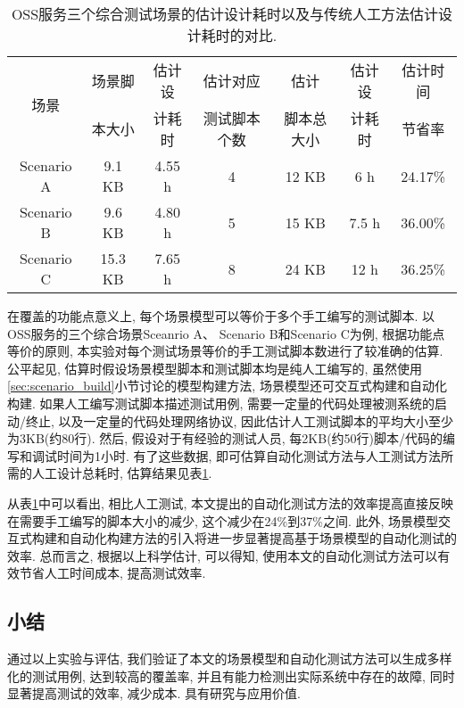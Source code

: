             \begin{table}[!htb]
                \centering
                \small
                \begin{tabular}{ccc|ccc|c}
                    \toprule
                    \multirow{2}{*}{场景} & 场景脚 & 估计设 & 估计对应     & 估计   & 估计设     & 估计时间  \\
                                          & 本大小     & 计耗时                        & 测试脚本个数 & 脚本总大小 & 计耗时 & 节省率 \\
                    \midrule
                    Scenario A & 9.1 KB & 4.55 h & 4 & 12 KB & 6 h & 24.17\% \\
                    Scenario B & 9.6 KB & 4.80 h & 5 & 15 KB & 7.5 h & 36.00\% \\
                    Scenario C & 15.3 KB & 7.65 h & 8 & 24 KB & 12 h & 36.25\% \\
                    \bottomrule
                \end{tabular}
                \caption[OSS服务中场景设计估计耗时与人工脚本设计估计耗时对比表]{OSS服务三个综合测试场景的估计设计耗时以及与传统人工方法估计设计耗时的对比.}
                \label{tab:efficiency_esti}
            \end{table}
            
            在覆盖的功能点意义上, 每个场景模型可以等价于多个手工编写的测试脚本. 以OSS服务的三个综合场景Sceanrio A、 Scenario B和Scenario C为例, 根据功能点等价的原则, 本实验对每个测试场景等价的手工测试脚本数进行了较准确的估算. 公平起见, 估算时假设场景模型脚本和测试脚本均是纯人工编写的, 虽然使用\ref{sec:scenario_build}小节讨论的模型构建方法, 场景模型还可交互式构建和自动化构建. 如果人工编写测试脚本描述测试用例, 需要一定量的代码处理被测系统的启动/终止, 以及一定量的代码处理网络协议, 因此估计人工测试脚本的平均大小至少为3KB(约80行). 然后, 假设对于有经验的测试人员, 每2KB(约50行)脚本/代码的编写和调试时间为1小时. 有了这些数据, 即可估算自动化测试方法与人工测试方法所需的人工设计总耗时, 估算结果见表\ref{tab:efficiency_esti}.
            
            从表\ref{tab:efficiency_esti}中可以看出, 相比人工测试, 本文提出的自动化测试方法的效率提高直接反映在需要手工编写的脚本大小的减少, 这个减少在24\%到37\%之间. 此外, 场景模型交互式构建和自动化构建方法的引入将进一步显著提高基于场景模型的自动化测试的效率. 总而言之, 根据以上科学估计, 可以得知, 使用本文的自动化测试方法可以有效节省人工时间成本, 提高测试效率.

        \subsection{小结}
            通过以上实验与评估, 我们验证了本文的场景模型和自动化测试方法可以生成多样化的测试用例, 达到较高的覆盖率, 并且有能力检测出实际系统中存在的故障, 同时显著提高测试的效率, 减少成本. 具有研究与应用价值.
